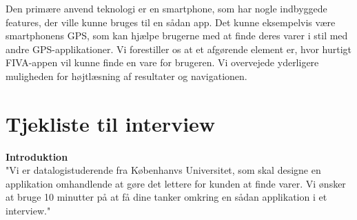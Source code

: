 \documentclass[12pt]{article}
\begin{document}
\noindent Den primære anvend teknologi er en smartphone, som har nogle indbyggede features, der ville kunne bruges til en sådan app. Det kunne eksempelvis være smartphonens GPS, som kan hjælpe brugerne med at finde deres varer i stil med andre GPS-applikationer. Vi forestiller os at et afgørende element er, hvor hurtigt FIVA-appen vil kunne finde en vare for brugeren. Vi overvejede yderligere muligheden for højtlæsning af resultater og navigationen.
   
\newpage

\section{Tjekliste til interview}
\textbf{Introduktion}\\
"Vi er datalogistuderende fra Københanvs Universitet, som skal designe en applikation omhandlende at gøre det lettere for kunden at finde varer. Vi ønsker at bruge 10 minutter på at få dine tanker omkring en sådan applikation  i et interview."
 
\end{document}
